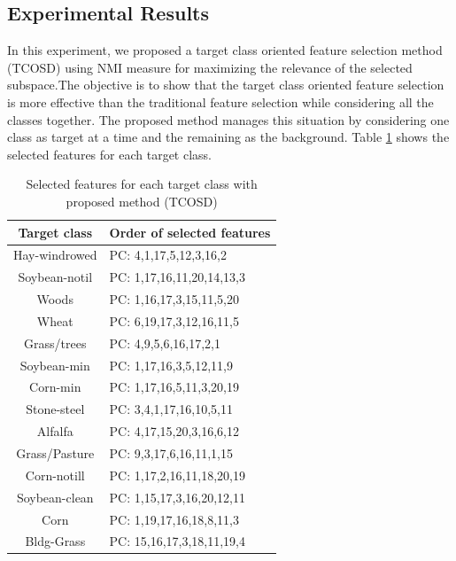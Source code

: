 \documentclass[document.tex]{subfiles}
\begin{document}
\subsection{Experimental Results}
In this experiment, we proposed a target class oriented feature selection method (TCOSD) using NMI measure for maximizing the relevance of the selected subspace.The objective is to show that the target class oriented feature selection is more effective than the traditional feature selection while considering all the classes together. The proposed method manages this situation by considering one class as target at a time and the remaining as the background. Table \ref{tab:Selected features for each target class with proposed method (TCOSD)} shows the selected features for each target class. 
\begin{table}[H]
	\caption{Selected features for each target class with proposed method (TCOSD)}
	\begin{center}
		\begin{tabular}{|c|l|}
			\hline
			Target class & Order of selected features\\ \hline
			Hay-windrowed & PC: 4,1,17,5,12,3,16,2\\ \hline
			Soybean-notil & PC: 1,17,16,11,20,14,13,3\\ \hline
			Woods & PC: 1,16,17,3,15,11,5,20\\ \hline
			Wheat & PC: 6,19,17,3,12,16,11,5\\ \hline
			Grass/trees & PC: 4,9,5,6,16,17,2,1\\ \hline
			Soybean-min & PC: 1,17,16,3,5,12,11,9\\ \hline
			Corn-min & PC: 1,17,16,5,11,3,20,19\\ \hline
			Stone-steel & PC: 3,4,1,17,16,10,5,11\\ \hline
			Alfalfa & PC: 4,17,15,20,3,16,6,12\\ \hline
			Grass/Pasture & PC: 9,3,17,6,16,11,1,15\\ \hline
			Corn-notill & PC: 1,17,2,16,11,18,20,19\\ \hline
			Soybean-clean & PC: 1,15,17,3,16,20,12,11\\ \hline
			Corn & PC: 1,19,17,16,18,8,11,3\\ \hline
			Bldg-Grass & PC: 15,16,17,3,18,11,19,4\\ \hline
		\end{tabular}
	\end{center}
	\label{tab:Selected features for each target class with proposed method (TCOSD)}
\end{table}
\end{document}
